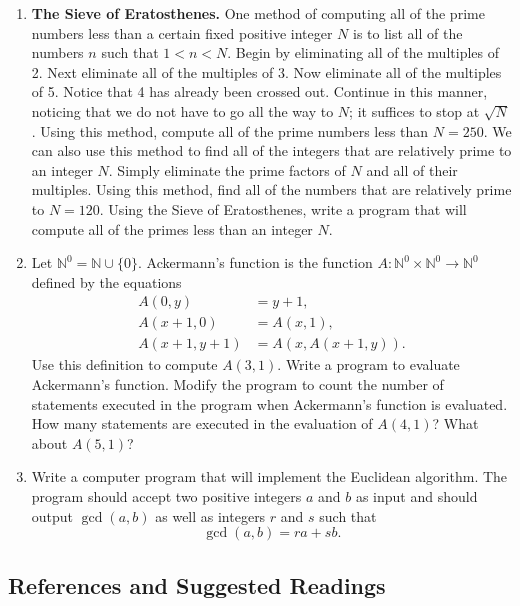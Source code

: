 {\small
\begin{enumerate}
 
\item
{\bf The Sieve of Eratosthenes.}  
One method of computing all of the prime numbers less than a certain fixed positive integer $N$ is to list all of the numbers $n$ such that $1 < n < N$.  Begin by eliminating all of the multiples of 2.  Next eliminate all of the multiples of 3. Now eliminate all of the  multiples of 5.  Notice that 4 has already been crossed out.  Continue in this manner, noticing that we do not have to go all the way to $N$; it suffices to stop at $\sqrt{N}$.  Using this method, compute all of the prime numbers less than $N = 250$.  We can also use this method to find all of the integers that are relatively prime to an integer $N$.  Simply eliminate the prime factors of $N$ and all of their multiples.  Using this method, find all of the numbers that are relatively prime to $N= 120$.  Using the Sieve of Eratosthenes, write a program that will compute all of the primes less than an integer $N$. 

\item
Let ${\mathbb N}^0 = {\mathbb N} \cup \{ 0 \}$. Ackermann's function is the function $A :{\mathbb N}^0 \times {\mathbb N}^0 \rightarrow {\mathbb N}^0$ defined by the equations 
\begin{align*}
A(0, y) & = y + 1, \\
A(x + 1, 0) & = A(x, 1), \\
A(x + 1, y + 1) & = A(x, A(x + 1, y)).
\end{align*}
Use this definition to compute $A(3, 1)$.  Write a program to evaluate Ackermann's function.  Modify the  program to count the number of statements executed in the program when Ackermann's function is evaluated.  How many statements are executed in the evaluation of $A(4, 1)$?  What about $A(5, 1)$?

\item
Write a computer program that will implement the Euclidean algorithm.  The program should accept two positive integers $a$ and $b$ as input and should output $\gcd( a,b)$ as well as integers $r$ and $s$ such that 
\[
\gcd( a,b) = ra + sb.
\]
 
\end{enumerate}
}
 
 
\subsection*{References and Suggested Readings} %

